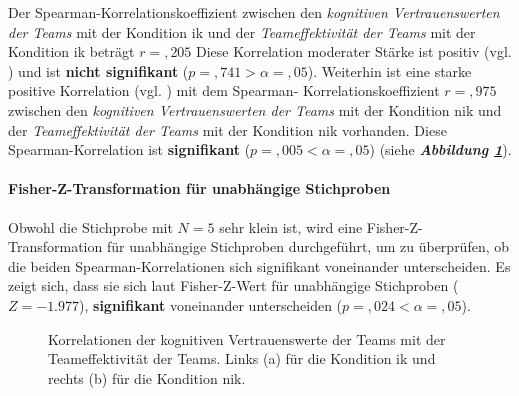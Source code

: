 \documentclass[a4paper,11pt]{article}%
\renewcommand{\\}{\vspace*{0.5\baselineskip} \newline}
\begin{document}
{Der Spearman-Korrelationskoeffizient zwischen den \textit{kognitiven Vertrauenswerten der Teams} mit der Kondition \ac{ik} und der \textit{Teameffektivität der Teams} mit der Kondition \ac{ik} beträgt $r =,205$ Diese Korrelation moderater Stärke ist positiv (vgl. \citep{cohen2013statistical}) und ist \textbf{nicht signifikant} ($p =,741 > \alpha = ,05$). \\
Weiterhin ist eine starke positive Korrelation (vgl. \citep{cohen2013statistical}) mit dem Spearman- Korrelationskoeffizient $r =,975$ zwischen den \textit{kognitiven Vertrauenswerten der Teams} mit der Kondition \newline \ac{nik} und der \textit{Teameffektivität der Teams} mit der Kondition \ac{nik} vorhanden. Diese Spearman-Korrelation ist \textbf{signifikant} ($p =,005 < \alpha = ,05$) (siehe \textbf{\textit{Abbildung \ref{H3_Korrelation_Auswertung}}}).

\paragraph{Fisher-Z-Transformation für unabhängige Stichproben}
Obwohl die Stichprobe mit $N=5$ sehr klein ist, wird eine Fisher-Z-Transformation für unabhängige Stichproben durchgeführt, um zu überprüfen, ob die beiden Spearman-Korrelationen sich signifikant voneinander unterscheiden.
Es zeigt sich, dass sie sich laut Fisher-Z-Wert für unabhängige Stichproben ($Z=-1.977$), \textbf{signifikant} voneinander unterscheiden ($p =,024 < \alpha = ,05$).

\begin{figure}[h]
  \centering
  \qquad
  \caption[Korrelationen der kognitiven Vertrauenswerte der Teams mit der Teameffektivität der Teams]{Korrelationen der kognitiven Vertrauenswerte der Teams mit der Teameffektivität der Teams. Links (a) für die Kondition \ac{ik} und rechts (b) für die Kondition \ac{nik}.}
  \label{H3_Korrelation_Auswertung}
\end{figure}

}
\end{document}
